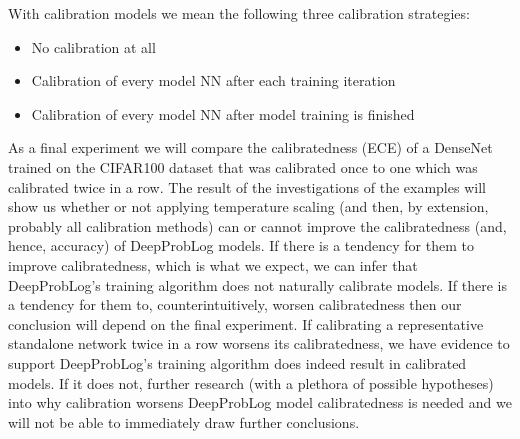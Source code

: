 With calibration models we mean the following three calibration strategies:
\begin{itemize}
  \item No calibration at all
  \item Calibration of every model NN after each training iteration
  \item Calibration of every model NN after model training is finished
\end{itemize}\par
As a final experiment we will compare the calibratedness (ECE) of a DenseNet trained on the CIFAR100 dataset that was calibrated once to one which was calibrated twice in a row.
The result of the investigations of the examples will show us whether or not applying temperature scaling (and then, by extension, probably all calibration methods) can or cannot improve the calibratedness (and, hence, accuracy) of DeepProbLog models. If there is a tendency for them to improve calibratedness, which is what we expect, we can infer that DeepProbLog's training algorithm does not naturally calibrate models. If there is a tendency for them to, counterintuitively, worsen calibratedness then our conclusion will depend on the final experiment. If calibrating a representative standalone network twice in a row worsens its calibratedness, we have evidence to support DeepProbLog's training algorithm does indeed result in calibrated models. If it does not, further research (with a plethora of possible hypotheses) into why calibration worsens DeepProbLog model calibratedness is needed and we will not be able to immediately draw further conclusions.